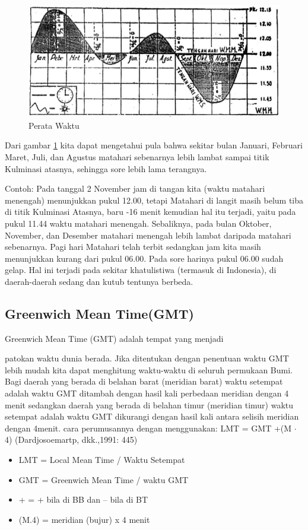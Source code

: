 	\begin{figure}[ht]
	\centerline{\includegraphics[width=1\textwidth]{figures/sejarahwaktu_peratawaktu}}
	\caption{Perata Waktu}
	\label{sejarahwaktu_Capture}
	\end{figure}

 Dari gambar \ref{sejarahwaktu_Capture} kita dapat mengetahui pula bahwa sekitar bulan Januari, Februari
 Maret, Juli, dan Agustus matahari sebenarnya lebih lambat sampai titik Kulminasi atasnya,
 sehingga sore lebih lama terangnya.
 
	Contoh: Pada tanggal 2 November jam di tangan kita (waktu matahari menengah) 
	menunjukkan pukul 12.00, tetapi Matahari di langit masih belum tiba di titik Kulminasi 
	Atasnya, baru -16 menit kemudian hal itu terjadi, yaitu pada pukul 11.44 waktu matahari 
	menengah. Sebaliknya, pada bulan Oktober, November, dan Desember matahari menengah 
	lebih lambat daripada matahari sebenarnya. Pagi hari Matahari telah terbit sedangkan 
	jam kita masih menunjukkan kurang dari pukul 06.00. Pada sore harinya pukul 06.00 sudah
	gelap. Hal ini terjadi pada sekitar khatulistiwa (termasuk di Indonesia), 
	di daerah-daerah sedang dan kutub tentunya berbeda.
	

\subsection{Greenwich Mean Time(GMT)}
Greenwich Mean Time (GMT) adalah tempat yang menjadi

 patokan waktu dunia berada. Jika ditentukan dengan penentuan waktu GMT lebih mudah kita
 dapat menghitung waktu-waktu di seluruh permukaan Bumi. Bagi daerah yang
 berada di belahan barat (meridian barat) waktu setempat adalah waktu GMT
 ditambah dengan hasil kali perbedaan meridian dengan 4 menit sedangkan daerah
 yang berada di belahan timur (meridian timur) waktu setempat adalah waktu GMT
 dikurangi dengan hasil kali antara selisih meridian dengan 4menit. 
 cara perumusannya dengan menggunakan:
					LMT = GMT +(M $\cdot$ 4)
			(Dardjosoemartp, dkk.,1991: 445)
\begin{itemize}		
\item LMT  = Local Mean Time / Waktu Setempat 
\item GMT  = Greenwich Mean Time / waktu GMT
\item +	 = + bila di BB dan – bila di BT 
\item (M.4) = meridian (bujur) x 4 menit
\end{itemize}


